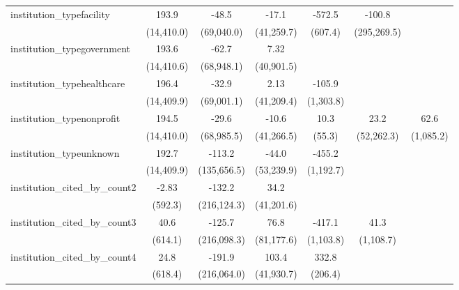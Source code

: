\begin{tabular}{lcccccc}
   institution\_typefacility             & 193.9       & -48.5       & -17.1       & -572.5        & -100.8      &   \\   
                                         & (14,410.0)  & (69,040.0)  & (41,259.7)  & (607.4)       & (295,269.5) &   \\   
   institution\_typegovernment           & 193.6       & -62.7       & 7.32        &               &             &   \\   
                                         & (14,410.6)  & (68,948.1)  & (40,901.5)  &               &             &   \\   
   institution\_typehealthcare           & 196.4       & -32.9       & 2.13        & -105.9        &             &   \\   
                                         & (14,409.9)  & (69,001.1)  & (41,209.4)  & (1,303.8)     &             &   \\   
   institution\_typenonprofit            & 194.5       & -29.6       & -10.6       & 10.3          & 23.2        & 62.6\\   
                                         & (14,410.0)  & (68,985.5)  & (41,266.5)  & (55.3)        & (52,262.3)  & (1,085.2)\\   
   institution\_typeunknown              & 192.7       & -113.2      & -44.0       & -455.2        &             &   \\   
                                         & (14,409.9)  & (135,656.5) & (53,239.9)  & (1,192.7)     &             &   \\   
   institution\_cited\_by\_count2        & -2.83       & -132.2      & 34.2        &               &             &   \\   
                                         & (592.3)     & (216,124.3) & (41,201.6)  &               &             &   \\   
   institution\_cited\_by\_count3        & 40.6        & -125.7      & 76.8        & -417.1        & 41.3        &   \\   
                                         & (614.1)     & (216,098.3) & (81,177.6)  & (1,103.8)     & (1,108.7)   &   \\   
   institution\_cited\_by\_count4        & 24.8        & -191.9      & 103.4       & 332.8         &             &   \\   
                                         & (618.4)     & (216,064.0) & (41,930.7)  & (206.4)       &             &   \\   

\end{tabular}
